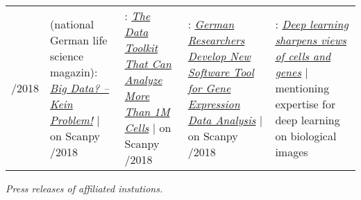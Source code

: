 \begin{longtable}[t]{R{\widthC} p{\widthB}}
/2018
&  (national German life science magazin): \href{https://laborwelt.de/aktuelles/nachrichten/nachricht/big-data-kein-problem.html}{\textit{Big Data? – Kein Problem!}} {\footnotesize$\vert$ on Scanpy}
/2018
& : \href{http://www.hcanews.com/news/the-data-toolkit-that-can-analyze-more-than-1m-cells}{\textit{The Data Toolkit That Can Analyze More Than 1M Cells}} {\footnotesize$\vert$ on Scanpy}
/2018 
& : \href{https://www.genomeweb.com/informatics/german-researchers-develop-new-software-tool-gene-expression-data-analysis}{\textit{German Researchers Develop New Software Tool for Gene Expression Data Analysis}} {\footnotesize$\vert$ on Scanpy}
/2018
& : \href{https://www.nature.com/magazine-assets/d41586-018-00004-w/d41586-018-00004-w.pdf}{\textit{Deep learning sharpens views of cells and genes}} {\footnotesize$\vert$ mentioning expertise for deep learning on biological images}
\end{longtable}

\noindent \textit{Press releases of affiliated instutions.}


